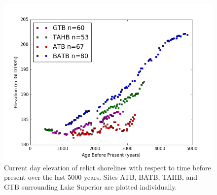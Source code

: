\begin{figure}[h]
	\includegraphics[width=1.1\linewidth]{data/theDataRaw.png}
	\caption{Current day elevation of relict shorelines with respect to time before present over the last 5000 years. Sites ATB, BATB, TAHB, and GTB surrounding Lake Superior are plotted individually.}
	\label{fig:rawData}
\end{figure} 
%
